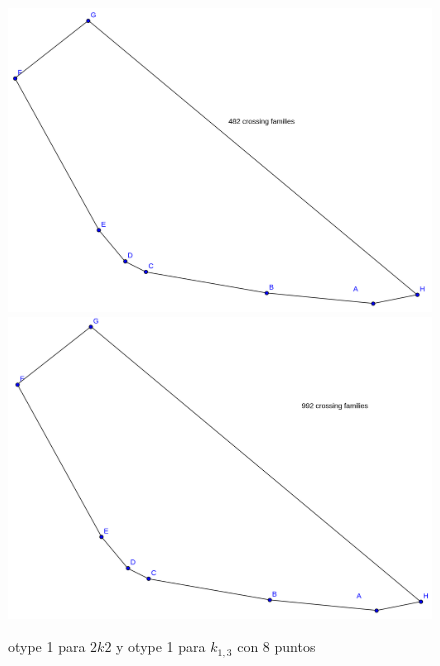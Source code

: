 \documentclass[11pt,epsf,times,letterpaper]{article}
\begin{document}
	\begin{figure}[!h]
		\includegraphics[scale=.25]{2k2/max8_otype1.png}
		\includegraphics[scale=.25]{k13/max8_otype1.png}
		\caption{otype 1 para $2k2$ y otype 1 para $k_{1,3}$ con 8 puntos}
		
	\end{figure}
	
\end{document}
